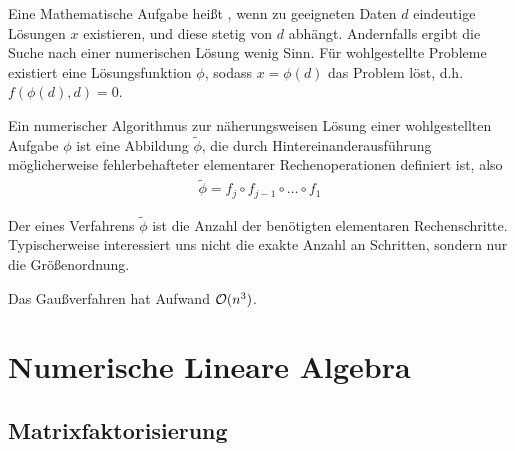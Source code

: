 \documentclass{report}
\begin{document}
	\begin{definition}
		Eine Mathematische Aufgabe heißt , wenn zu geeigneten Daten $d$ eindeutige Lösungen $x$ existieren, und diese stetig von $d$ abhängt. Andernfalls ergibt die Suche nach einer numerischen Lösung wenig Sinn. Für wohlgestellte Probleme existiert eine Lösungsfunktion $\phi$, sodass $x = \phi(d)$ das Problem löst, d.h. $f(\phi(d),d) = 0$.
	\end{definition}
	\begin{definition}
		Ein numerischer Algorithmus zur näherungsweisen Lösung einer wohlgestellten Aufgabe $\phi$ ist eine Abbildung $\tilde{\phi}$, die durch Hintereinanderausführung möglicherweise fehlerbehafteter elementarer Rechenoperationen definiert ist, also 
		\begin{align*}
			\tilde{\phi} = f_j \circ f_{j-1} \circ \hdots \circ f_1
		\end{align*}
	\end{definition}
	\begin{definition}
		Der  eines Verfahrens $\tilde \phi$ ist die Anzahl der benötigten elementaren Rechenschritte. Typischerweise interessiert uns nicht die exakte Anzahl an Schritten, sondern nur die Größenordnung.
	\end{definition}
	\begin{proposition}
		Das Gaußverfahren hat Aufwand $\mathcal{O}(n^3)$.
	\end{proposition}
\chapter{Numerische Lineare Algebra}
\section{Matrixfaktorisierung}
\end{document}
